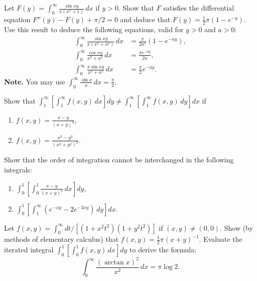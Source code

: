 \begin{problembox}
Let $F(y) = \int_{0}^{\infty} \frac{\sin xy}{x(x^2 + 1)} \, dx$ if $y > 0$. Show that $F$ satisfies the differential equation $F''(y) - F(y) + \pi / 2 = 0$ and deduce that $F(y) = \frac{1}{2} \pi (1 - e^{-y})$. Use this result to deduce the following equations, valid for $y > 0$ and $a > 0$:
\begin{align*}
\int_{0}^{\infty} \frac{\sin xy}{x(x^2 + a^2)} \, dx &= \frac{\pi}{2a^2} (1 - e^{-ay}), \\
\int_{0}^{\infty} \frac{\cos xy}{x^2 + a^2} \, dx &= \frac{\pi e^{-ay}}{2a}, \\
\int_{0}^{\infty} \frac{x \sin xy}{x^2 + a^2} \, dx &= \frac{\pi}{2} e^{-ay}.
\end{align*}
\textbf{Note.} You may use $\int_{0}^{\infty} \frac{\sin x}{x} \, dx = \frac{\pi}{2}.$
\end{problembox}

\begin{problembox}
Show that $\int_{1}^{\infty} \left[ \int_{1}^{\infty} f(x, y) \, dx \right] dy \neq \int_{1}^{\infty} \left[ \int_{1}^{\infty} f(x, y) \, dy \right] dx$ if
\begin{enumerate}[label=(\alph*)]
    \item $f(x, y) = \frac{x - y}{(x + y)^3}$,
    \item $f(x, y) = \frac{x^2 - y^2}{(x^2 + y^2)^2}.$
\end{enumerate}
\end{problembox}

\begin{problembox}
Show that the order of integration cannot be interchanged in the following integrals:
\begin{enumerate}[label=(\alph*)]
    \item $\int_{0}^{1} \left[ \int_{0}^{1} \frac{x - y}{(x + y)^{3}} \, dx \right] dy$,
    \item $\int_{0}^{1} \left[ \int_{1}^{\infty} (e^{-xy} - 2e^{-2xy}) \, dy \right] dx.$
\end{enumerate}
\end{problembox}

\begin{problembox}
Let $f(x, y) = \int_{0}^{\infty} dt / [(1 + x^{2}t^{2})(1 + y^{2}t^{2})]$ if $(x, y) \neq (0, 0)$. Show (by methods of elementary calculus) that $f(x, y) = \frac{1}{2}\pi(x + y)^{-1}$. Evaluate the iterated integral $\int_{0}^{1} \left[ \int_{0}^{1} f(x, y) \, dx \right] dy$ to derive the formula:
\[\int_{0}^{\infty} \frac{(\arctan x)^{2}}{x^{2}} \, dx = \pi \log 2.\]
\end{problembox}

